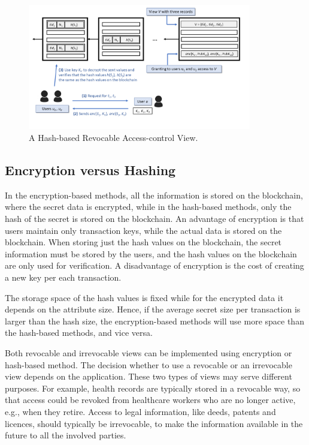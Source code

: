 \begin{figure}
    \centering
    \includegraphics[trim=0 50 0 0, clip,width=0.87\textwidth]{diagram/view/hash_revocable.png}
    \caption{A Hash-based Revocable Access-control View.}
    \label{diagram:view:hash_revocable}
\end{figure}


\subsection{Encryption versus Hashing}
\label{ch:view:ac_views:comparison}
In the encryption-based methods, all the information is stored on the blockchain,  where the secret data is encrypted, while in the hash-based methods, only the hash of the secret is stored on the blockchain. An advantage of encryption is that users maintain only transaction keys, while the actual data is stored on the blockchain. When storing just the hash values on the blockchain, the secret information must be stored by the users, and the hash values on the blockchain are only used for verification.
A disadvantage of encryption is the cost of creating a new key per each transaction.  

The storage space of the hash values is fixed while for the encrypted data it depends on the attribute size. Hence, if the average secret size per transaction is larger than the hash size, the encryption-based methods will use more space than the hash-based methods, and vice versa.

Both revocable and irrevocable views can be implemented using  encryption or hash-based method. The decision whether to use a revocable or an irrevocable view depends on the application. These two types of views may serve different purposes. For example, health records are typically stored in a revocable way, so that access could be revoked from healthcare workers who are no longer active, e.g., when they retire. Access to legal information, like deeds, patents and licences, should typically be irrevocable, to make the information available in the future to all the involved parties. 


